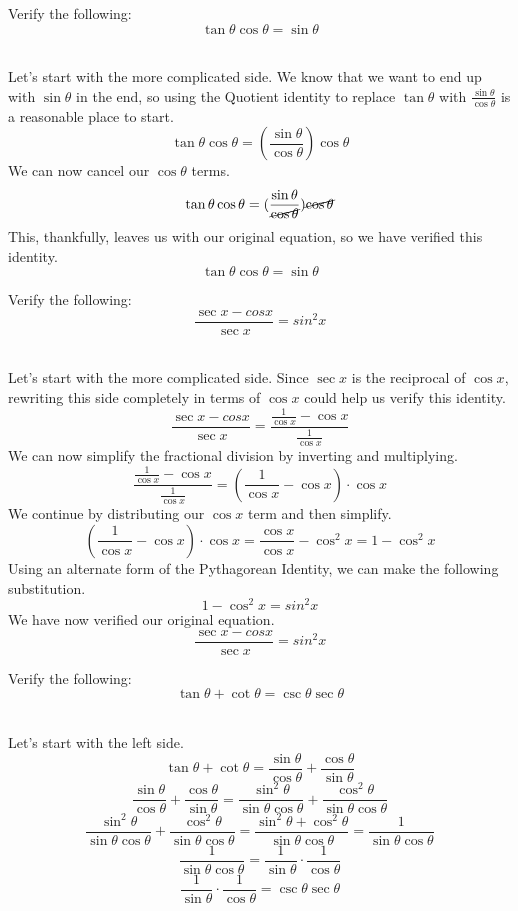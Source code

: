\documentclass{ximera}
\begin{document}
\begin{example}
Verify the following:\\
\[
\tan{\theta}\cos{\theta}=\sin{\theta}
\]
\\
\begin{explanation}
Let's start with the more complicated side. We know that we want to end up with $\sin{\theta}$ in the end, so using the Quotient identity to replace $\tan{\theta}$ with $\frac{\sin{\theta}}{\cos{\theta}}$ is a reasonable place to start.
\[
\tan{\theta}\cos{\theta}=(\frac{\sin{\theta}}{\cos{\theta}})\cos{\theta}
\]
We can now cancel our $\cos{\theta}$ terms.
\[
\tan{\theta}\cos{\theta}=(\frac{\sin{\theta}}{\cancel{\cos{\theta}}})\cancel{\cos{\theta}}
\]
This, thankfully, leaves us with our original equation, so we have verified this identity.
\[
\tan{\theta}\cos{\theta}=\sin{\theta}
\]
\end{explanation}
\end{example}

\begin{example}
Verify the following:\\
\[
\frac{\sec{x}-cos{x}}{\sec{x}}=sin^2{x}
\]
\\
\begin{explanation}
Let's start with the more complicated side. Since $\sec{x}$ is the reciprocal of $\cos{x}$, rewriting this side completely in terms of $\cos{x}$ could help us verify this identity.
\[
\frac{\sec{x}-cos{x}}{\sec{x}} = \frac{\frac{1}{\cos{x}}-\cos{x}}{\frac{1}{\cos{x}}}
\]
We can now simplify the fractional division by inverting and multiplying.
\[
\frac{\frac{1}{\cos{x}}-\cos{x}}{\frac{1}{\cos{x}}} = (\frac{1}{\cos{x}}-\cos{x}) \cdot \cos{x}
\]
We continue by distributing our $\cos{x}$ term and then simplify.
\[
(\frac{1}{\cos{x}}-\cos{x}) \cdot \cos{x} = \frac{\cos{x}}{\cos{x}}-\cos^2{x} = 1 - \cos^2{x}
\]
Using an alternate form of the Pythagorean Identity, we can make the following substitution.
\[
1 - \cos^2{x} = sin^2{x}
\]
We have now verified our original equation.
\[
\frac{\sec{x}-cos{x}}{\sec{x}}=sin^2{x}
\]
\end{explanation}
\end{example}
\begin{example}
Verify the following:\\
\[
\tan{\theta}+ \cot{\theta}=\csc{\theta}\sec{\theta}
\]
\\
\begin{explanation}
Let's start with the left side.
\[
\tan{\theta}+ \cot{\theta}=\frac{\sin{\theta}}{\cos{\theta}} + \frac{\cos{\theta}}{\sin{\theta}}
\]
\[
\frac{\sin{\theta}}{\cos{\theta}} + \frac{\cos{\theta}}{\sin{\theta}} = \frac{\sin^2{\theta}}{\sin{\theta}\cos{\theta}} + \frac{\cos^2{\theta}}{\sin{\theta}\cos{\theta}}
\]
\[
 \frac{\sin^2{\theta}}{\sin{\theta}\cos{\theta}} + \frac{\cos^2{\theta}}{\sin{\theta}\cos{\theta}} = \frac{\sin^2{\theta} + \cos^2{\theta}}{\sin{\theta}\cos{\theta}} = \frac{1}{\sin{\theta}\cos{\theta}}
\]
\[
\frac{1}{\sin{\theta}\cos{\theta}} = \frac{1}{\sin{\theta}} \cdot \frac{1}{\cos{\theta}}
\]
\[
\frac{1}{\sin{\theta}} \cdot \frac{1}{\cos{\theta}} = \csc{\theta}\sec{\theta}
\]
\end{explanation}
\end{example}
\end{document}
